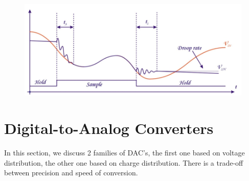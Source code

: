 \begin{figure}[h!]
	\centering
	\includegraphics[width=14cm]{figures/ch18/SH2.jpg}
	\caption{}
	\label{fig:SH2}
\end{figure}

\section{Digital-to-Analog Converters}
In this section, we discuss 2 families of DAC's, the first one based on voltage distribution, the other one based on charge distribution. There is a trade-off between precision and speed of conversion.
